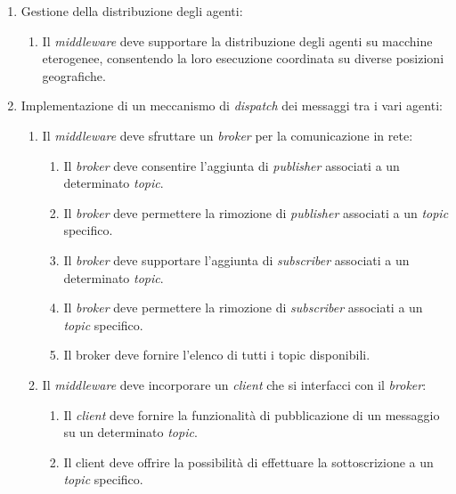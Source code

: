 \begin{enumerate}
      \item Gestione della distribuzione degli agenti:
            \begin{enumerate}
                  \item  Il \textit{middleware} deve supportare la distribuzione degli agenti su macchine eterogenee,
                        consentendo la loro esecuzione coordinata su diverse posizioni geografiche.
            \end{enumerate}

      \item Implementazione di un meccanismo di \textit{dispatch} dei messaggi tra i vari agenti:
            \begin{enumerate}
                  \item Il \textit{middleware} deve sfruttare un \textit{broker} per la comunicazione in rete:
                        \begin{enumerate}
                              \item Il \textit{broker} deve consentire l'aggiunta di \textit{publisher} associati a un determinato \textit{topic}.
                              \item Il \textit{broker} deve permettere la rimozione di \textit{publisher} associati a un \textit{topic} specifico.
                              \item Il \textit{broker} deve supportare l'aggiunta di \textit{subscriber} associati a un determinato \textit{topic}.
                              \item Il \textit{broker} deve permettere la rimozione di \textit{subscriber} associati a un \textit{topic} specifico.
                              \item Il broker deve fornire l'elenco di tutti i topic disponibili.
                        \end{enumerate}
                  \item Il \textit{middleware} deve incorporare un \textit{client} che si interfacci con il \textit{broker}:
                        \begin{enumerate}
                              \item Il \textit{client} deve fornire la funzionalità di pubblicazione di un messaggio su un determinato \textit{topic}.
                              \item Il client deve offrire la possibilità di effettuare la sottoscrizione a un \textit{topic} specifico.

\end{enumerate}
\end{enumerate}
\end{enumerate}

